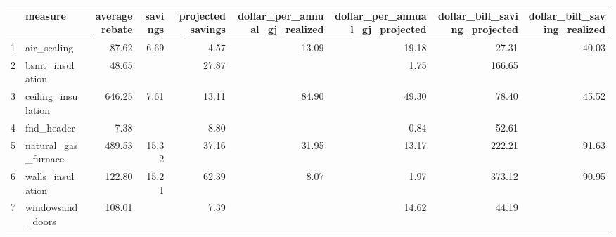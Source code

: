 \begin{table}[ht]
\centering
\begin{tabular}{rlrrrrrrr}
  \hline
 & measure & average\_rebate & savings & projected\_savings & dollar\_per\_annual\_gj\_realized & dollar\_per\_annual\_gj\_projected & dollar\_bill\_saving\_projected & dollar\_bill\_saving\_realized \\ 
  \hline
1 & air\_sealing & 87.62 & 6.69 & 4.57 & 13.09 & 19.18 & 27.31 & 40.03 \\ 
  2 & bsmt\_insulation & 48.65 &  & 27.87 &  & 1.75 & 166.65 &  \\ 
  3 & ceiling\_insulation & 646.25 & 7.61 & 13.11 & 84.90 & 49.30 & 78.40 & 45.52 \\ 
  4 & fnd\_header & 7.38 &  & 8.80 &  & 0.84 & 52.61 &  \\ 
  5 & natural\_gas\_furnace & 489.53 & 15.32 & 37.16 & 31.95 & 13.17 & 222.21 & 91.63 \\ 
  6 & walls\_insulation & 122.80 & 15.21 & 62.39 & 8.07 & 1.97 & 373.12 & 90.95 \\ 
  7 & windowsand\_doors & 108.01 &  & 7.39 &  & 14.62 & 44.19 &  \\ 
   \hline
\end{tabular}
\end{table}
